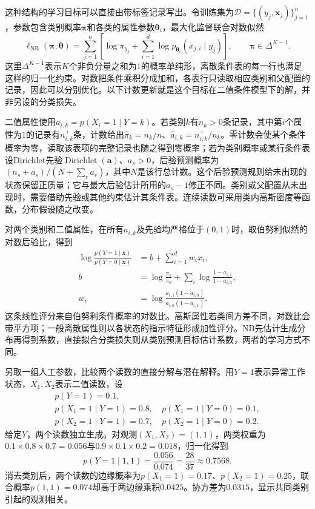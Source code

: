 这种结构的学习目标可以直接由带标签记录写出。令训练集为$\mathcal D=\{(y_j,\bm x_j)\}_{j=1}^n$，参数包含类别概率$\bm\pi$和各类的属性参数$\bm\theta_i$，最大化监督联合对数似然
\begin{equation}
  \ell_{\mathrm{NB}}(\bm\pi,\bm\theta)
  =\sum_{j=1}^n\left[\log\pi_{y_j}
       +\sum_{i=1}^d\log p_{\bm\theta_i}(x_{j,i}\mid y_j)\right],
  \qquad \bm\pi\in\Delta^{K-1}.
  \label{eq:pgm-static-directed-naive-objective}
\end{equation}
这里$\Delta^{K-1}$表示$K$个非负分量之和为$1$的概率单纯形，离散条件表的每一行也满足这样的归一化约束。对数把条件乘积分成加和，各表行只读取相应类别和父配置的记录，因此可以分别优化。以下计数更新就是这个目标在二值条件模型下的解，并非另设的分类损失。

二值属性使用$a_{i,k}=p(X_i=1\mid Y=k)$。若类别$k$有$n_k>0$条记录，其中第$i$个属性为$1$的记录有$n_{i,k}^{+}$条，计数给出$\widehat\pi_k=n_k/n$、$\widehat a_{i,k}=n_{i,k}^{+}/n_k$。零计数会使某个条件概率为零，读取该表项的完整记录也随之得到零概率；若为类别概率或某行条件表设Dirichlet先验$\operatorname{Dirichlet}(\bm a)$、$a_s>0$，后验预测概率为$(n_s+a_s)/(N+\sum_r a_r)$，其中$N$是该行总计数。这个后验预测规则给未出现的状态保留正质量；它与最大后验估计所用的$a_s-1$修正不同。类别或父配置从未出现时，需要借助先验或其他约束估计其条件表。连续读数可采用类内高斯密度等函数，分布假设随之改变。

对两个类别和二值属性，在所有$a_{i,k}$及先验均严格位于$(0,1)$时，取伯努利似然的对数后验比，得到
\begin{equation}
  \label{eq:pgm-static-directed-naive-boundary}
  \begin{aligned}
  \log\frac{p(Y=1\mid\bm{x})}{p(Y=0\mid\bm{x})}
    &=b+\sum_{i=1}^{d}w_i x_i,\\
  b&=\log\frac{\pi_1}{\pi_0}
       +\sum_i\log\frac{1-a_{i,1}}{1-a_{i,0}},\\
  w_i&=\log\frac{a_{i,1}(1-a_{i,0})}
                       {a_{i,0}(1-a_{i,1})}.
  \end{aligned}
\end{equation}
这条线性评分来自伯努利条件概率的对数比。高斯属性若类间方差不同，对数比会带平方项；一般离散属性则以各状态的指示特征形成加性评分。NB先估计生成分布再得到系数，直接拟合分类损失则从类别预测目标估计系数，两者的学习方式不同。

\begin{example}[两个二值读数]
  \label{ex:pgm-static-directed-binary}
  另取一组人工参数，比较两个读数的直接分解与潜在解释。用$Y=1$表示异常工作状态，$X_1,X_2$表示二值读数，设
  \[
  \begin{gathered}
    p(Y=1)=0.1,\\
    p(X_1=1\mid Y=1)=0.8,\quad
    p(X_1=1\mid Y=0)=0.1,\\
    p(X_2=1\mid Y=1)=0.7,\quad
    p(X_2=1\mid Y=0)=0.2.
  \end{gathered}
  \]
  给定$Y$，两个读数独立生成。对观测$(X_1,X_2)=(1,1)$，两类权重为$0.1\times0.8\times0.7=0.056$与$0.9\times0.1\times0.2=0.018$，归一化得到
  \[
    p(Y=1\mid1,1)=\frac{0.056}{0.074}
      =\frac{28}{37}\approx0.7568.
  \]
  消去类别后，两个读数的边缘概率为$p(X_1=1)=0.17$、$p(X_2=1)=0.25$，联合概率$p(1,1)=0.074$却高于两边缘乘积$0.0425$。协方差为$0.0315$，显示共同类别引起的观测相关。
\end{example}

